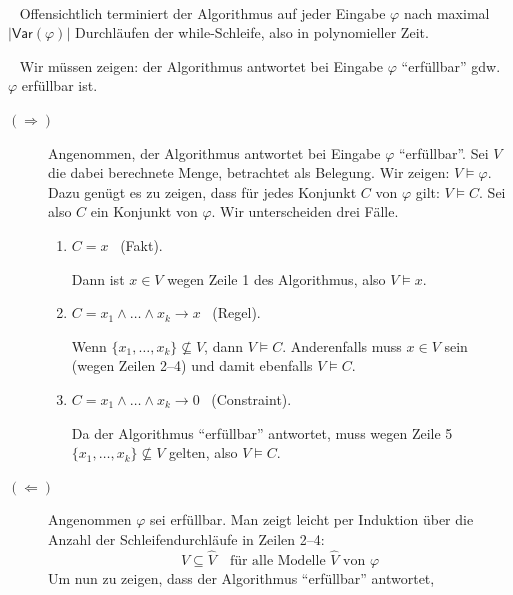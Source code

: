 \documentclass[fontsize=11pt, twoside=false, numbers=autoenddot]{scrbook}
\begin{document}
\par\noindent
\begin{beweis}
  ~\par
  ~
  Offensichtlich terminiert der Algorithmus auf jeder Eingabe $\varphi$
  nach maximal $|\textsf{Var}(\varphi)|$ Durchläufen der while-Schleife,
  also in polynomieller Zeit.

  \par\medskip
  ~
  Wir müssen zeigen:
  der Algorithmus antwortet bei Eingabe $\varphi$ "`erfüllbar"' gdw.\ $\varphi$ erfüllbar ist.
  \begin{description}
    \item[$(\Rightarrow)$]
      Angenommen, der Algorithmus antwortet bei Eingabe $\varphi$ "`erfüllbar"'.
      Sei $V$ die dabei berechnete Menge, betrachtet als Belegung.
      Wir zeigen: $V \models \varphi$.
      Dazu genügt es zu zeigen, dass für jedes Konjunkt $C$ von $\varphi$ gilt: $V \models C$.
      Sei also $C$ ein Konjunkt von $\varphi$. Wir unterscheiden drei Fälle.
      \begin{enumerate}
        \item
          $C = x$~ (Fakt).
          \par
          Dann ist $x \in V$ wegen Zeile 1 des Algorithmus, also $V \models x$.
        \item
          $C = x_1 \land \dots \land x_k \to x$~ (Regel).
          \par
          Wenn $\{x_1,\dots,x_k\} \nsubseteq V$,
          dann $V \models C$.
          Anderenfalls muss $x \in V$ sein (wegen Zeilen 2--4)
          und damit ebenfalls $V \models C$.
        \item
          $C = x_1 \land \dots \land x_k \to 0$~ (Constraint).
          \par
          Da der Algorithmus "`erfüllbar"' antwortet,
          muss wegen Zeile 5 $\{x_1,\dots,x_k\} \nsubseteq V$ gelten,
          also $V \models C$.
      \end{enumerate}
    \item[$(\Leftarrow)$]
      Angenommen $\varphi$ sei erfüllbar.
      Man zeigt leicht per Induktion über die Anzahl der Schleifendurchläufe
      in Zeilen 2--4:
      \begin{equation*}
        \tag{$*$}
        V \subseteq \widehat V \quad \text{für alle Modelle $\widehat V$ von $\varphi$}
      \end{equation*}
      Um nun zu zeigen, dass der Algorithmus "`erfüllbar"' antwortet,

\end{description}
\end{beweis}
\end{document}
